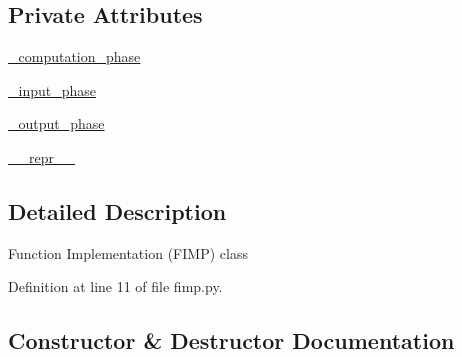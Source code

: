 \subsection*{Private Attributes}
\begin{DoxyCompactItemize}
\item 
\hyperlink{classsylva_1_1base_1_1fimp_1_1fimp_a2ded98f1192f049ef6add49430aa5b6f}{\+\_\+computation\+\_\+phase}
\item 
\hyperlink{classsylva_1_1base_1_1fimp_1_1fimp_accafc4753ff5abcd3b21b46d7d66a60d}{\+\_\+input\+\_\+phase}
\item 
\hyperlink{classsylva_1_1base_1_1fimp_1_1fimp_ae26cf19440b7c972c813885660f44e55}{\+\_\+output\+\_\+phase}
\item 
\hyperlink{classsylva_1_1base_1_1fimp_1_1fimp_a1721d4305e5735e8137e4454e896d1e4}{\+\_\+\+\_\+repr\+\_\+\+\_\+}
\end{DoxyCompactItemize}


\subsection{Detailed Description}
\begin{DoxyVerb}  Function Implementation (FIMP) class
\end{DoxyVerb}
 

Definition at line 11 of file fimp.\+py.



\subsection{Constructor \& Destructor Documentation}
\mbox{\label{classsylva_1_1base_1_1fimp_1_1fimp_a2c4f614b7df71848cf53d8e11103a77e}} 
